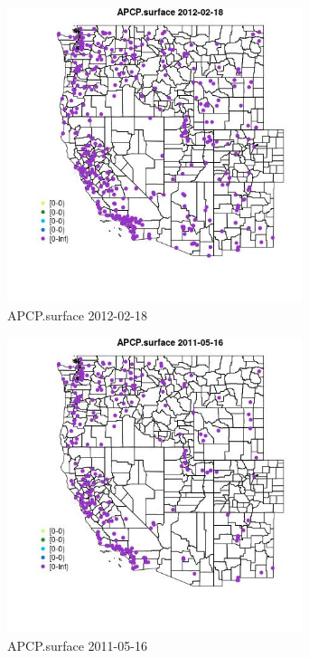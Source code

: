\begin{figure} 
\centering  
\includegraphics[width=0.77\textwidth]{Code_Outputs/Report_ML_input_PM25_Step4_part_f_de_duplicated_aveswNAs_MapObsAPCPsurface2012-02-18.jpg} 
\caption{\label{fig:Report_ML_input_PM25_Step4_part_f_de_duplicated_aveswNAsMapObsAPCPsurface2012-02-18}APCP.surface 2012-02-18} 
\end{figure} 
 

\begin{figure} 
\centering  
\includegraphics[width=0.77\textwidth]{Code_Outputs/Report_ML_input_PM25_Step4_part_f_de_duplicated_aveswNAs_MapObsAPCPsurface2011-05-16.jpg} 
\caption{\label{fig:Report_ML_input_PM25_Step4_part_f_de_duplicated_aveswNAsMapObsAPCPsurface2011-05-16}APCP.surface 2011-05-16} 
\end{figure} 
 

